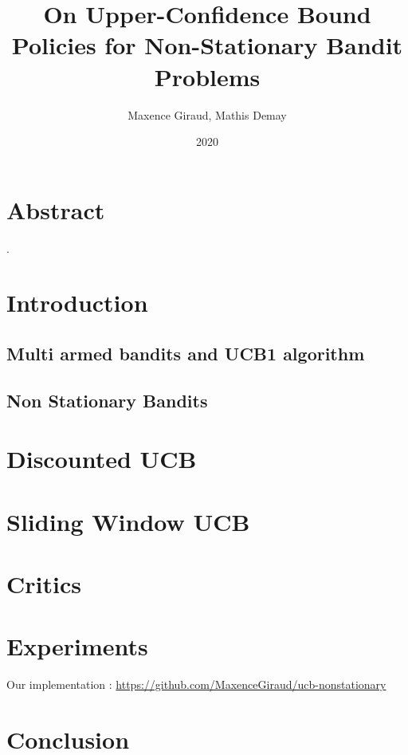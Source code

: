 \documentclass{article}
\title{On Upper-Confidence Bound Policies for Non-Stationary Bandit Problems}
\author{Maxence Giraud, Mathis Demay}
\date{2020}
\begin{document}
\maketitle

\section*{Abstract}
\cite{garivier2008upperconfidence}.



\section{Introduction}

\subsection{Multi armed bandits and UCB1 algorithm}



\subsection{Non Stationary Bandits}

\section{Discounted UCB}


\section{Sliding Window UCB}



\section{Critics}

\section{Experiments}
Our implementation : \url{https://github.com/MaxenceGiraud/ucb-nonstationary} 

\section{Conclusion}


\end{document}

